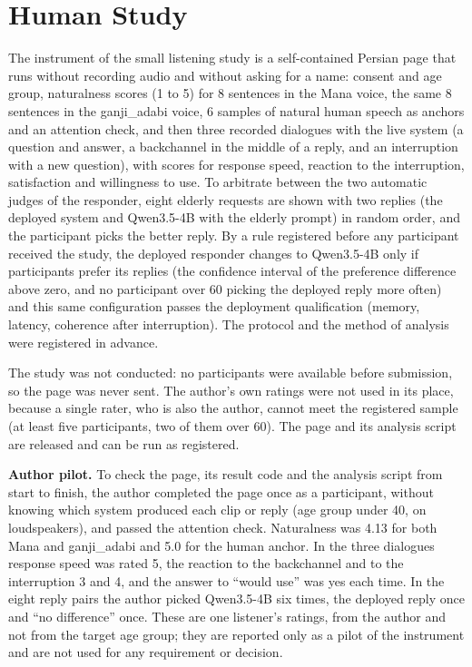 \section{Human Study}
\label{sec:res-study}

The instrument of the small listening study is a self-contained Persian page that runs without
recording audio and without asking for a name: consent and age group, naturalness scores (1 to
5) for 8 sentences in the Mana voice, the same 8 sentences in the ganji\_adabi voice, 6 samples
of natural human speech as anchors and an attention check, and then three recorded dialogues
with the live system (a question and answer, a backchannel in the middle of a reply, and an
interruption with a new question), with scores for response speed, reaction to the
interruption, satisfaction and willingness to use. To arbitrate between the two automatic judges
of the responder, eight elderly requests are shown with two replies (the deployed system and
Qwen3.5-4B with the elderly prompt) in random order, and the participant picks the better reply.
By a rule registered before any participant received the study, the deployed responder changes to Qwen3.5-4B
only if participants prefer its replies (the confidence interval of the preference difference
above zero, and no participant over 60 picking the deployed reply more often) and this same
configuration passes the deployment qualification (memory, latency, coherence after
interruption). The protocol and the method of analysis were registered in advance.

The study was not conducted: no participants were available before submission, so the page was
never sent. The author's own ratings were not used in its place, because a single rater, who is
also the author, cannot meet the registered sample (at least five participants, two of them over
60). The page and its analysis script are released and can be run
as registered.

\textbf{Author pilot.} To check the page, its result code and the analysis script from start to
finish, the author completed the page once as a participant, without knowing which system produced
each clip or reply (age group under 40, on loudspeakers), and passed the attention check. Naturalness
was 4.13 for both Mana and ganji\_adabi and 5.0 for the human anchor. In the three dialogues response
speed was rated 5, the reaction to the backchannel and to the interruption 3 and 4, and the answer to
``would use'' was yes each time. In the eight reply pairs the author picked Qwen3.5-4B six times, the
deployed reply once and ``no difference'' once. These are one listener's ratings, from the author
and not from the target age group; they are reported only as a pilot of the instrument and are not
used for any requirement or decision.

